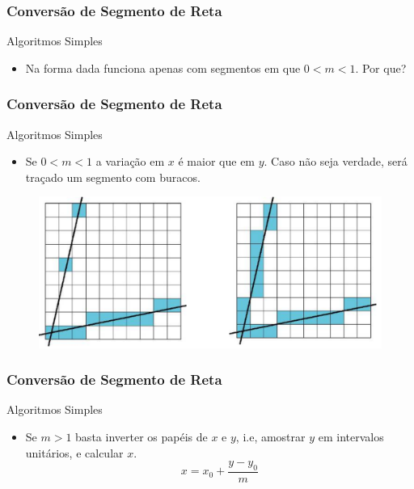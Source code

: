 \documentclass{beamer}
\begin{document}
\begin{frame}
\frametitle{Conversão de Segmento de Reta}

		\begin{block}{Algoritmos Simples}
		\begin{itemize}
			\item Na forma dada funciona apenas com segmentos em que $ 0 < m < 1$. Por que?
		\end{itemize}
	\end{block}
	
\end{frame}


\begin{frame}
\frametitle{Conversão de Segmento de Reta}

		\begin{block}{Algoritmos Simples}
		\begin{itemize}
			\item Se $0 < m < 1$ a variação em $x$ é maior que em $y$. Caso não seja verdade, será traçado um segmento com buracos.
		\end{itemize}
	\end{block}
	
	\begin{figure}[!h]
			\begin{center}
			\includegraphics[width=1\textwidth]{Figures/Ret}
			\end{center}
		\end{figure}
	
\end{frame}

\begin{frame}
\frametitle{Conversão de Segmento de Reta}

		\begin{block}{Algoritmos Simples}
		\begin{itemize}
			\item Se $m > 1$ basta inverter os papéis de $x$ e $y$, i.e, amostrar $y$ em intervalos unitários, e calcular $x$.
			\begin{equation*}
				x = x_0 + \frac{y-y_0}{m}
			\end{equation*}
		\end{itemize}
	\end{block}
	
\end{frame}


\end{document}
